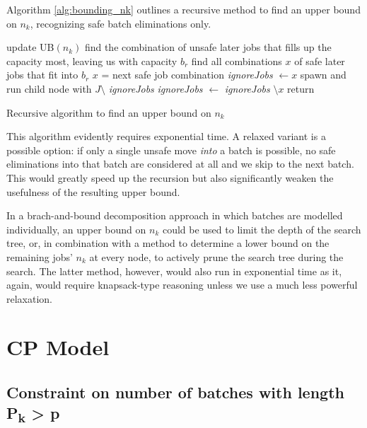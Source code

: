Algorithm \ref{alg:bounding_nk} outlines a recursive method to find an upper
bound on $n_k$, recognizing safe batch eliminations only.

\begin{algorithm}[h]
\fontsize{9pt}{11.5pt}\selectfont
\begin{algorithmic}
 
  \State update UB$(n_k)$
\EndIf
\State find the combination of unsafe later jobs that fills up the capacity
most, leaving us with capacity $b_r$ 
\State find all combinations $x$ of safe later jobs that fit into $b_r$
\Repeat
  \State $x$ = next safe job combination
  \State \textit{ignoreJobs} $\gets x$ 
  \State spawn and run child node with $J \setminus$ \textit{ignoreJobs}
  \State \textit{ignoreJobs} $\gets$ \textit{ignoreJobs} $\setminus x$
\State return
\end{algorithmic}
\caption{Recursive algorithm to find an upper bound on $n_k$}
\label{alg:bounding_nk}
\end{algorithm}

This algorithm evidently requires exponential time. A relaxed variant is a
possible option: if only a single unsafe move \textit{into} a batch is possible,
no safe eliminations into that batch are considered at all and we skip to the
next batch. This would greatly speed up the recursion but also significantly
weaken the usefulness of the resulting upper bound.

In a brach-and-bound decomposition approach in which batches are modelled
individually, an upper bound on $n_k$ could be used to limit the depth of the
search tree, or, in combination with a method to determine a lower bound on the
remaining jobs' $n_k$ at every node, to actively prune the search tree during
the search. The latter method, however, would also run in exponential time as
it, again, would require knapsack-type reasoning unless we use a much less powerful
relaxation.

\section{CP Model}
\subsection[Constraint on the number of batches with length $P_k >
p$]{Constraint on number of batches with length {\sansitalicfont
P\textsubscript{k}} > {\sansitalicfont p}}

